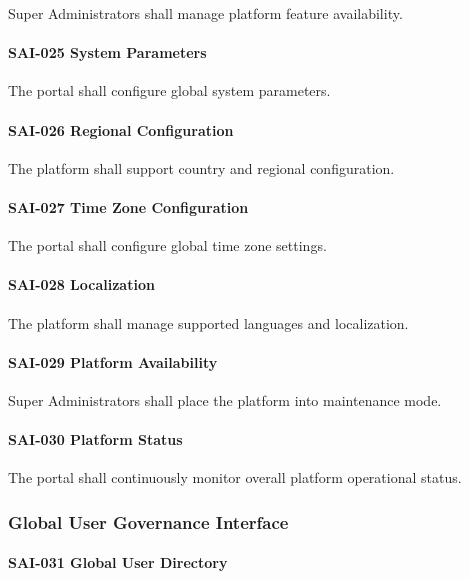 Super Administrators shall manage platform feature availability.

\paragraph{SAI-025 System Parameters}

The portal shall configure global system parameters.

\paragraph{SAI-026 Regional Configuration}

The platform shall support country and regional configuration.

\paragraph{SAI-027 Time Zone Configuration}

The portal shall configure global time zone settings.

\paragraph{SAI-028 Localization}

The platform shall manage supported languages and localization.

\paragraph{SAI-029 Platform Availability}

Super Administrators shall place the platform into maintenance mode.

\paragraph{SAI-030 Platform Status}

The portal shall continuously monitor overall platform operational
status.


\subsubsection*{Global User Governance Interface}

\paragraph{SAI-031 Global User Directory}

